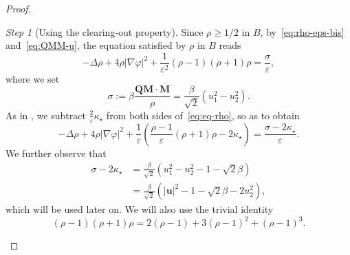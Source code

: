 \documentclass[a4paper, 11pt, twoside, leqno]{article}
\theoremstyle{definition}              %
\theoremstyle{remark}                  %
\newtheorem{step}{Step}
\newcommand{\abs}[1]{\left| #1 \right|}                             %
\newcommand{\Q}{\mathbf{Q}}
\newcommand{\M}{\mathbf{M}}
\renewcommand{\u}{\mathbf{u}}
\newcommand{\eps}{\varepsilon}
\begin{document}
\begin{proof}
\begin{step}[Using the clearing-out property]
	Since $\rho \geq 1/2$ in $B$, by~\eqref{eq:rho-eps-bis} 
	and~\eqref{eq:QMM-u}, the equation satisfied by $\rho$ in $B$ reads
    \begin{equation}\label{eq:eq-rho}
        -\Delta \rho + 4\rho \abs{\nabla \varphi}^2 
        + \frac{1}{\eps^2}(\rho - 1) (\rho + 1)\rho 
        = \frac{\sigma}{\eps},
    \end{equation}
    where we set
    \[
        \sigma := \beta \frac{\Q \M\cdot \M}{\rho} 
        = \frac{\beta}{\sqrt{2}}\left(u_1^2 - u_2^2\right).
    \]
    As in \cite[proof of Lemma~3.7]{CDS1}, we subtract $\frac{2}{\eps} \kappa_\star$ from both 
    sides of~\eqref{eq:eq-rho}, so as to obtain
    \begin{equation}\label{eq:eq-rho-bis}
        -\Delta \rho + 4 \rho \abs{\nabla \varphi}^2 + \frac{1}{\eps}\left(\frac{\rho - 1}{\eps} (\rho + 1)\rho - 2 \kappa_\star \right) = \frac{\sigma - 2 \kappa_\star}{\eps}.
    \end{equation}
    We further observe that
    \begin{equation}\label{eq:sigma-2k*}
    \begin{split}
    	\sigma - 2 \kappa_\star &= \frac{\beta}{\sqrt{2}}\left( u_1^2 - u_2^2 - 1 - \sqrt{2}\beta \right) \\
    	&=\frac{\beta}{\sqrt{2}}\left( \abs{\u}^2 - 1 - \sqrt{2}\beta - 2 u_2^2 \right), 
    \end{split}
    \end{equation}
 	which will be used later on. We will also use the trivial identity 
    \begin{equation}\label{eq:trivial-rho}
    	(\rho - 1)(\rho + 1) \rho = 2(\rho - 1) + 3(\rho - 1)^2 + (\rho-1)^3. 
    \end{equation}
    \end{step}
    

\end{proof}
\end{document}
